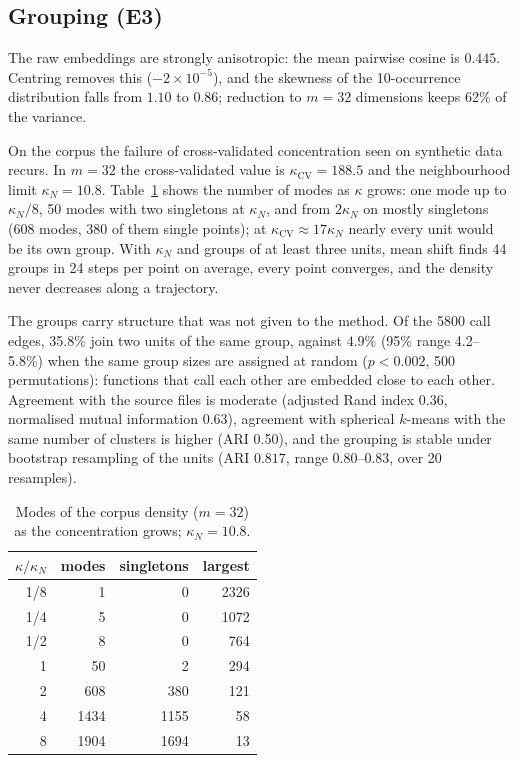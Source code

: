 \documentclass[10pt,twocolumn]{article}
\theoremstyle{definition}
\theoremstyle{remark}
\begin{document}
\subsection{Grouping (E3)}
The raw embeddings are strongly anisotropic: the mean pairwise cosine is $0.445$.
Centring removes this ($-2\times10^{-5}$), and the skewness of the 10-occurrence distribution falls from $1.10$ to $0.86$; reduction to $m=32$ dimensions keeps 62\% of the variance.

On the corpus the failure of cross-validated concentration seen on synthetic data recurs.
In $m=32$ the cross-validated value is $\kappa_{\mathrm{CV}}=188.5$ and the neighbourhood limit $\kappa_N=10.8$.
Table~\ref{tab:modes} shows the number of modes as $\kappa$ grows: one mode up to $\kappa_N/8$, 50 modes with two singletons at $\kappa_N$, and from $2\kappa_N$ on mostly singletons (608 modes, 380 of them single points); at $\kappa_{\mathrm{CV}}\approx17\kappa_N$ nearly every unit would be its own group.
With $\kappa_N$ and groups of at least three units, mean shift finds 44 groups in 24 steps per point on average, every point converges, and the density never decreases along a trajectory.

The groups carry structure that was not given to the method.
Of the 5800 call edges, 35.8\% join two units of the same group, against $4.9\%$ (95\% range 4.2--5.8\%) when the same group sizes are assigned at random ($p<0.002$, 500 permutations): functions that call each other are embedded close to each other.
Agreement with the source files is moderate (adjusted Rand index 0.36, normalised mutual information 0.63), agreement with spherical $k$-means with the same number of clusters is higher (ARI 0.50), and the grouping is stable under bootstrap resampling of the units (ARI $0.817$, range 0.80--0.83, over 20 resamples).

\begin{table}[t]\centering\small
\caption{Modes of the corpus density ($m=32$) as the concentration grows; $\kappa_N=10.8$.}\label{tab:modes}
\begin{tabular}{rrrr}\toprule
$\kappa/\kappa_N$ & modes & singletons & largest \\\midrule
1/8 & 1 & 0 & 2326 \\
1/4 & 5 & 0 & 1072 \\
1/2 & 8 & 0 & 764 \\
1 & 50 & 2 & 294 \\
2 & 608 & 380 & 121 \\
4 & 1434 & 1155 & 58 \\
8 & 1904 & 1694 & 13 \\\bottomrule
\end{tabular}
\end{table}
\end{document}
